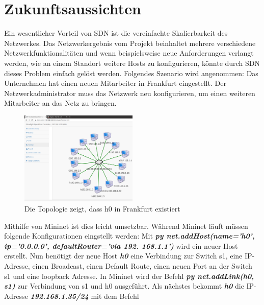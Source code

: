 \documentclass[fontsize=12pt,paper=a4,open=any,parskip=half,
  twoside=false,toc=listof,toc=bibliography,fleqn,leqno,
  captions=nooneline,captions=tableabove,british]{scrbook}
\begin{document}
{\section{Zukunftsaussichten}

Ein wesentlicher Vorteil von SDN ist die vereinfachte Skalierbarkeit des Netzwerkes. Das  Netzwerkergebnis vom Projekt beinhaltet mehrere verschiedene Netzwerkfunktionalitäten und wenn beispielsweise neue Anforderungen verlangt werden, wie an einem Standort weitere Hosts zu konfigurieren, könnte durch SDN dieses Problem einfach gelöst werden. Folgendes Szenario wird angenommen: Das Unternehmen hat einen neuen Mitarbeiter in Frankfurt eingestellt. Der Netzwerkadministrator muss das Netzwerk neu konfigurieren, um einen weiteren Mitarbeiter an das Netz zu bringen.

\begin{figure}
	\vspace{-\baselineskip}
	\centering
	\includegraphics[width=0.5\textwidth]{Bilder/neuetopo}
	\caption{Die Topologie zeigt, dass h0 in Frankfurt existiert}
	\label{neutopo}
\end{figure}
Mithilfe von Mininet ist dies leicht umsetzbar. Während Mininet läuft müssen folgende Konfigurationen eingstellt werden: Mit \textit{\textbf{py net.addHost(name='h0', ip='0.0.0.0', defaultRouter='via 192. 168.1.1')}} wird ein neuer Host erstellt. Nun benötigt der neue Host \textit{\textbf{h0}} eine Verbindung zur Switch s1, eine IP-Adresse, einen Broadcast, einen Default Route, einen neuen Port an der Switch s1 und eine loopback Adresse. In Mininet wird der Befehl \textit{\textbf{py net.addLink(h0, s1)}} zur Verbindung von s1 und h0 ausgeführt. Als nächstes bekommt \textit{\textbf{h0}} die IP-Adresse \textit{\textbf{192.168.1.35/24}} mit dem Befehl 
}
\end{document}
